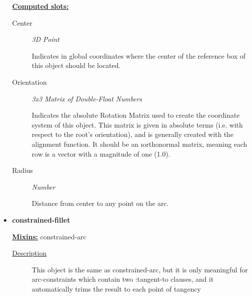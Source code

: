 \documentclass [11pt]{book}
\begin{document}
\begin{itemize}
\textbf{
\underline{Computed slots:}}

\begin{description}

\item [Center]
\emph{3D Point}

 Indicates in global coordinates where the center of the reference
box of this object should be located.




\item [Orientation]
\emph{3x3 Matrix of Double-Float Numbers}

 Indicates the absolute Rotation Matrix used to create
the coordinate system of this object. This matrix is given in absolute terms (i.e. with
respect to the root's orientation), and is generally created with the alignment function.
It should be an 
\i{orthonormal} matrix, meaning each row is a vector with a magnitude
of one (1.0).




\item [Radius]
\emph{Number}

 Distance from center to any point on the arc.




\end{description}







\item {}
\label{prim:constrained-fillet}
\textbf{constrained-fillet}


\textbf{
\underline{Mixins:}} constrained-arc





\begin{description}

\item [
\underline{Description}]


This object is the same as constrained-arc, but it is only
meaningful for arc-constraints which contain two :tangent-to clauses,
and it automatically trims the result to each point of tangency



\end{description}









\end{itemize}
\end{document}
